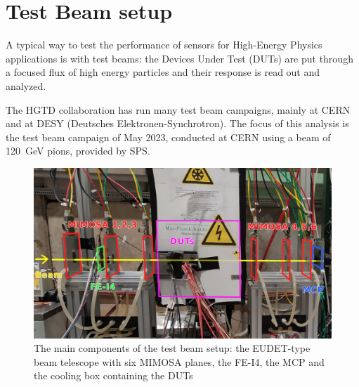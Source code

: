 \chapter{Test Beam setup}\label{chap:testbeam_setup}

A typical way to test the performance of sensors for High-Energy Physics applications is with test beams: the Devices Under Test (DUTs) are put through a focused flux of high energy particles and their response is read out and analyzed. %

The HGTD collaboration has run many test beam campaigns, mainly at CERN and at DESY (Deutsches Elektronen-Synchrotron). The focus of this analysis is the test beam campaign of May 2023, conducted at CERN using a beam of \qty{120}{\giga\electronvolt} pions, provided by SPS.

\begin{figure}[h!tbp]
    \centering
    \includegraphics[width=.95\linewidth]{Images/TestBeam_setup/TestBeam_setup_redrawn.png}
    \captionsetup{width=\captionwidth}
    \caption{The main components of the test beam setup: the EUDET-type beam telescope with six MIMOSA planes, the FE-I4, the MCP and the cooling box containing the DUTs}
    \label{fig:testbeam_setup}
\end{figure}


